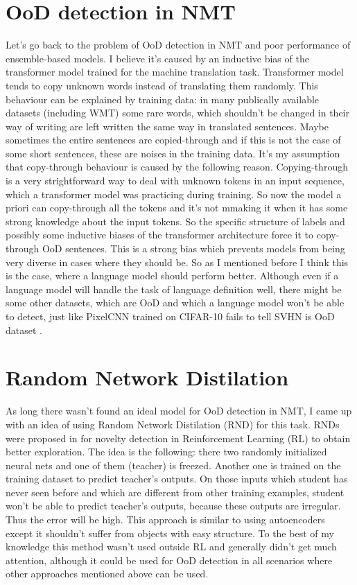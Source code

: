 \documentclass{article}
\begin{document}
\section{OoD detection in NMT}
    Let's go back to the problem of OoD detection in NMT and poor performance of ensemble-based models. I believe it's caused by an inductive bias of the transformer model \cite{transformer} trained for the machine translation task. Transformer model tends to copy unknown words instead of translating them randomly. This behaviour can be explained by training data: in many publically available datasets (including WMT) some rare words, which shouldn't be changed in their way of writing are left written the same way in translated sentences. Maybe sometimes the entire sentences are copied-through and if this is not the case of some short sentences, these are noises in the training data. It's my assumption that copy-through behaviour is caused by the following reason. Copying-through is a very strightforward way to deal with unknown tokens in an input sequence, which a transformer model was practicing during training. So now the model a priori can copy-through all the tokens and it's not mmaking it when it has some strong knowledge about the input tokens. So the specific structure of labels and possibly some inductive biases of the transformer architecture force it to copy-through OoD sentences. This is a strong bias which prevents models from being very diverse in cases where they should be. So as I mentioned before I think this is the case, where a language model should perform better. Although even if a language model will handle the task of language definition well, there might be some other datasets, which are OoD and which a language model won't be able to detect, just like PixelCNN trained on CIFAR-10 fails to tell SVHN is OoD dataset \cite{do_dont_know}.

\section{Random Network Distilation}
    As long there wasn't found an ideal model for OoD detection in NMT, I came up with an idea of using Random Network Distilation (RND) for this task. RNDs were proposed in \cite{random_network} for novelty detection in Reinforcement Learning (RL) to obtain better exploration. The idea is the following: there two randomly initialized neural nets and one of them (teacher) is freezed. Another one is trained on the training dataset to predict teacher's outputs. On those inputs which student has never seen before and which are different from other training examples, student won't be able to predict teacher's outputs, because these outputs are irregular. Thus the error will be high. This approach is similar to using autoencoders except it shouldn't suffer from objects with easy structure. To the best of my knowledge this method wasn't used outside RL and generally didn't get much attention, although it could be used for OoD detection in all scenarios where other approaches mentioned above can be used.
\end{document}
